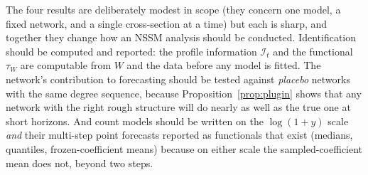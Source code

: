 \documentclass[12pt]{article}
\theoremstyle{plain}
\theoremstyle{definition}
\theoremstyle{remark}
\newcommand{\calI}{\mathcal{I}}
\newcommand{\tauW}{\tau_W}
\begin{document}
The four results are deliberately modest in scope (they concern one model, a fixed network, and a single cross-section at a time) but each is sharp, and together they change how an NSSM analysis should be conducted. Identification should be computed and reported: the profile information $\calI_t$ and the functional $\tauW$ are computable from $W$ and the data before any model is fitted. The network's contribution to forecasting should be tested against \emph{placebo} networks with the same degree sequence, because Proposition~\ref{prop:plugin} shows that any network with the right rough structure will do nearly as well as the true one at short horizons. And count models should be written on the $\log(1+y)$ scale \emph{and} their multi-step point forecasts reported as functionals that exist (medians, quantiles, frozen-coefficient means) because on either scale the sampled-coefficient mean does not, beyond two steps.
\end{document}
